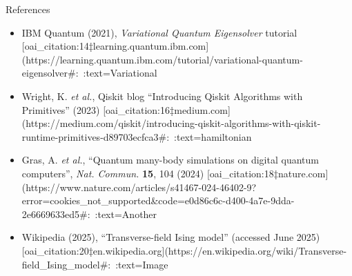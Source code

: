 \documentclass{beamer}
\begin{document}
\begin{frame}[allowframebreaks]{References}
\begin{itemize}
\item IBM Quantum (2021), \emph{Variational Quantum Eigensolver} tutorial [oai_citation:14‡learning.quantum.ibm.com](https://learning.quantum.ibm.com/tutorial/variational-quantum-eigensolver#:~:text=Variational%
\item Wright, K. \emph{et al.}, Qiskit blog “Introducing Qiskit Algorithms with Primitives” (2023) [oai_citation:16‡medium.com](https://medium.com/qiskit/introducing-qiskit-algorithms-with-qiskit-runtime-primitives-d89703ecfca3#:~:text=hamiltonian%
\item Gras, A. \emph{et al.}, “Quantum many-body simulations on digital quantum computers”, \emph{Nat. Commun.} \textbf{15}, 104 (2024) [oai_citation:18‡nature.com](https://www.nature.com/articles/s41467-024-46402-9?error=cookies_not_supported&code=e0d86c6c-d400-4a7e-9dda-2e6669633ed5#:~:text=Another%
\item Wikipedia (2025), “Transverse-field Ising model” (accessed June 2025) [oai_citation:20‡en.wikipedia.org](https://en.wikipedia.org/wiki/Transverse-field_Ising_model#:~:text=Image%
\end{itemize}
\end{frame}
\end{document}
